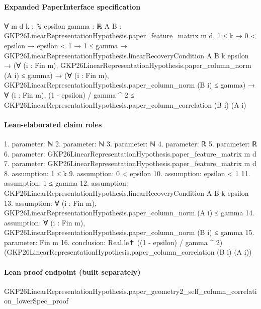 \documentclass[10pt]{article}
\begin{document}
\paragraph{Expanded PaperInterface specification}
\begin{ReviewVerbatim}
∀ {m d k : ℕ} {epsilon gamma : ℝ} {A B : GKP26LinearRepresentationHypothesis.paper_feature_matrix m d},
  1 ≤ k →
    0 < epsilon →
      epsilon < 1 →
        1 ≤ gamma →
          GKP26LinearRepresentationHypothesis.linearRecoveryCondition A B k epsilon →
            (∀ (i : Fin m), GKP26LinearRepresentationHypothesis.paper_column_norm (A i) ≤ gamma) →
              (∀ (i : Fin m), GKP26LinearRepresentationHypothesis.paper_column_norm (B i) ≤ gamma) →
                ∀ (i : Fin m),
                  (1 - epsilon) / gamma ^ 2 ≤ GKP26LinearRepresentationHypothesis.paper_column_correlation (B i) (A i)
\end{ReviewVerbatim}

\paragraph{Lean-elaborated claim roles}\begin{ReviewVerbatim}
1. parameter: ℕ
2. parameter: ℕ
3. parameter: ℕ
4. parameter: ℝ
5. parameter: ℝ
6. parameter: GKP26LinearRepresentationHypothesis.paper_feature_matrix m d
7. parameter: GKP26LinearRepresentationHypothesis.paper_feature_matrix m d
8. assumption: 1 ≤ k
9. assumption: 0 < epsilon
10. assumption: epsilon < 1
11. assumption: 1 ≤ gamma
12. assumption: GKP26LinearRepresentationHypothesis.linearRecoveryCondition A B k epsilon
13. assumption: ∀ (i : Fin m), GKP26LinearRepresentationHypothesis.paper_column_norm (A i) ≤ gamma
14. assumption: ∀ (i : Fin m), GKP26LinearRepresentationHypothesis.paper_column_norm (B i) ≤ gamma
15. parameter: Fin m
16. conclusion: Real.le✝ ((1 - epsilon) / gamma ^ 2) (GKP26LinearRepresentationHypothesis.paper_column_correlation (B i) (A i))
\end{ReviewVerbatim}

\paragraph{Lean proof endpoint (built separately)}\begin{ReviewVerbatim}
GKP26LinearRepresentationHypothesis.paper_geometry2_self_column_correlation_lowerSpec_proof
\end{ReviewVerbatim}
\end{document}

